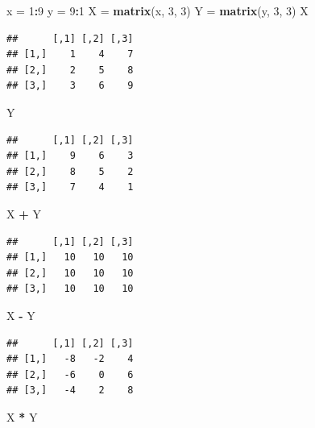 \documentclass[]{book}
\newenvironment{Shaded}{\begin{snugshade}}{\end{snugshade}}
\newcommand{\KeywordTok}[1]{\textcolor[rgb]{0.13,0.29,0.53}{\textbf{#1}}}
\newcommand{\DecValTok}[1]{\textcolor[rgb]{0.00,0.00,0.81}{#1}}
\newcommand{\StringTok}[1]{\textcolor[rgb]{0.31,0.60,0.02}{#1}}
\newcommand{\OperatorTok}[1]{\textcolor[rgb]{0.81,0.36,0.00}{\textbf{#1}}}
\newcommand{\NormalTok}[1]{#1}
\begin{document}
\begin{Shaded}
\begin{Highlighting}[]
\NormalTok{x =}\StringTok{ }\DecValTok{1}\OperatorTok{:}\DecValTok{9}
\NormalTok{y =}\StringTok{ }\DecValTok{9}\OperatorTok{:}\DecValTok{1}
\NormalTok{X =}\StringTok{ }\KeywordTok{matrix}\NormalTok{(x, }\DecValTok{3}\NormalTok{, }\DecValTok{3}\NormalTok{)}
\NormalTok{Y =}\StringTok{ }\KeywordTok{matrix}\NormalTok{(y, }\DecValTok{3}\NormalTok{, }\DecValTok{3}\NormalTok{)}
\NormalTok{X}
\end{Highlighting}
\end{Shaded}

\begin{verbatim}
##      [,1] [,2] [,3]
## [1,]    1    4    7
## [2,]    2    5    8
## [3,]    3    6    9
\end{verbatim}

\begin{Shaded}
\begin{Highlighting}[]
\NormalTok{Y}
\end{Highlighting}
\end{Shaded}

\begin{verbatim}
##      [,1] [,2] [,3]
## [1,]    9    6    3
## [2,]    8    5    2
## [3,]    7    4    1
\end{verbatim}

\begin{Shaded}
\begin{Highlighting}[]
\NormalTok{X }\OperatorTok{+}\StringTok{ }\NormalTok{Y}
\end{Highlighting}
\end{Shaded}

\begin{verbatim}
##      [,1] [,2] [,3]
## [1,]   10   10   10
## [2,]   10   10   10
## [3,]   10   10   10
\end{verbatim}

\begin{Shaded}
\begin{Highlighting}[]
\NormalTok{X }\OperatorTok{-}\StringTok{ }\NormalTok{Y}
\end{Highlighting}
\end{Shaded}

\begin{verbatim}
##      [,1] [,2] [,3]
## [1,]   -8   -2    4
## [2,]   -6    0    6
## [3,]   -4    2    8
\end{verbatim}

\begin{Shaded}
\begin{Highlighting}[]
\NormalTok{X }\OperatorTok{*}\StringTok{ }\NormalTok{Y}
\end{Highlighting}
\end{Shaded}
\end{document}
